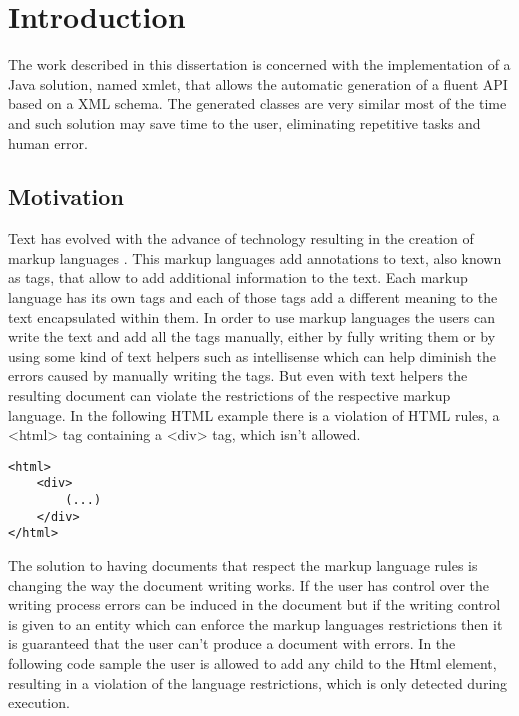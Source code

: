 % 
%  
%
\chapter{Introduction}

The work described in this dissertation is concerned with the implementation of a Java solution, named xmlet, that allows the automatic generation of a fluent API based on a XML schema. The generated classes are very similar most of the time and such solution may save time to the user, eliminating repetitive tasks and human error.

\section{Motivation}


Text has evolved with the advance of technology resulting in the creation of markup languages \cite{markuplanguages}. This markup languages add annotations to text, also known as tags, that allow to add additional information to the text. Each markup language has its own tags and each of those tags add a different meaning to the text encapsulated within them. In order to use markup languages the users can write the text and add all the tags manually, either by fully writing them or by using some kind of text helpers such as intellisense which can help diminish the errors caused by manually writing the tags. But even with text helpers the resulting document can violate the restrictions of the respective markup language. In the following HTML example there is a violation of HTML rules, a <html> tag containing a <div> tag, which isn't allowed.

\newpage

\begin{lstlisting}[caption={Failed HTML rule validation},captionpos=b]
<html>
	<div>
		(...)
	</div>
</html>
\end{lstlisting}

\noindent
The solution to having documents that respect the markup language rules is changing the way the document writing works. If the user has control over the writing process errors can be induced in the document but if the writing control is given to an entity which can enforce the markup languages restrictions then it is guaranteed that the user can't produce a document with errors. In the following code sample the user is allowed to add any child to the Html element, resulting in a violation of the language restrictions, which is only detected during execution.

